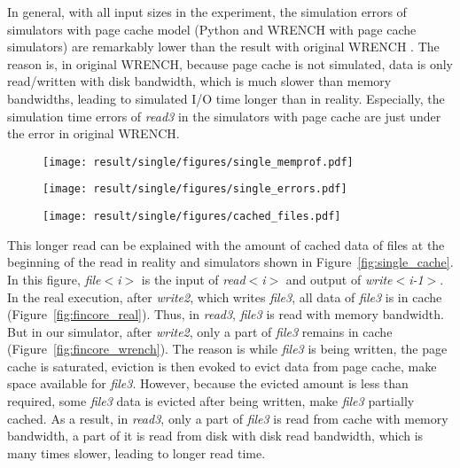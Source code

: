 \documentclass[conference]{IEEEtran}
\begin{document}
			In general, with all input sizes in the experiment, the simulation errors 
			of simulators with page cache model (Python and WRENCH with page cache simulators) 
			are remarkably lower than the result with original WRENCH . 
			The reason is, in original WRENCH, because page cache is not simulated, 
			data is only read/written with disk bandwidth, which is much slower 
			than memory bandwidths, leading to simulated I/O time longer than in reality.
			Especially, the simulation time errors of \textit{read3} in the simulators 
			with page cache are just under the error in original WRENCH. 
		
			\begin{figure*}
			\centering
			\begin{subfigure}{\linewidth}
				\centering
   				\texttt{[image: result/single/figures/single\_memprof.pdf]}
			\end{subfigure}
			\caption{Memory profiling results with different input file sizes}
			\label{fig:single_memprof}	
			\begin{subfigure}{\linewidth}
				\centering
   				\texttt{[image: result/single/figures/single\_errors.pdf]}
			\end{subfigure}
			\caption{Simulation errors with different input file sizes}
			\label{fig:single_error}	
			\begin{subfigure}{\linewidth}
				\centering
   				\texttt{[image: result/single/figures/cached\_files.pdf]}
			\end{subfigure}	
			\label{fig:single_cache}
   			\caption{Amount of file data in cache after each I/O activity with 100GB of input}
			\end{figure*}			

			This longer read can be explained with the amount of cached data of files 
			at the beginning of the read in reality and simulators shown in 
			Figure~\ref{fig:single_cache}. 			
			In this figure, \textit{file$<$i$>$} is the input of \textit{read$<$i$>$} and 
			output of \textit{write$<$i-1$>$}. 
			In the real execution, after \textit{write2}, which writes \textit{file3}, 
			all data of \textit{file3} is in cache (Figure~\ref{fig:fincore_real}). 
			Thus, in \textit{read3}, \textit{file3} is read with memory bandwidth. 
			But in our simulator, after \textit{write2}, only a part of \textit{file3} 
			remains in cache (Figure~\ref{fig:fincore_wrench}). 
			The reason is while \textit{file3}  is being written, the page cache is saturated, 
			eviction is then evoked to evict data from page cache, make space 
			available for \textit{file3}. 
			However, because the evicted amount is less than required, 
			some \textit{file3} data is evicted after being written, make \textit{file3} 
			partially cached. 
			As a result, in \textit{read3}, only a part of \textit{file3} is read from cache 
			with memory bandwidth, a part of it is read from disk with disk read bandwidth, 
			which is many times slower, leading to longer read time. 			
			
\end{document}
